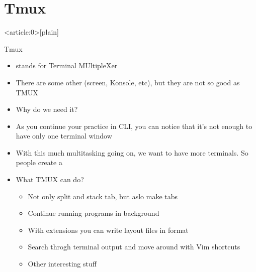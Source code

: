 \documentclass[usenames,dvipsnames,10pt,aspectratio=169]{beamer}
\begin{document}
\section{Tmux}
{ %
    \begin{frame}<article:0>[plain]
     \end{frame}
}

\begin{frame}{Tmux}
    \begin{itemize}
        \item {} stands for Terminal MUltipleXer
        \item There are some other (screen, Konsole, etc), but they are not so good as TMUX
        \item Why do we need it?
        \item As you continue your practice in CLI, you can notice that it's not enough to have only one terminal window
        \item With this much multitasking going on, we want to have more terminals. So people create a 
        \item What TMUX can do?
        \begin{itemize}
            \item Not only split and stack tab, but aslo make tabs
            \item Continue running programs in background
            \item With extensions you can write layout files in  format
            \item Search throgh terminal output and move around with Vim shortcuts
            \item Other interesting stuff
        \end{itemize}
    \end{itemize}
\end{frame}
\end{document}
